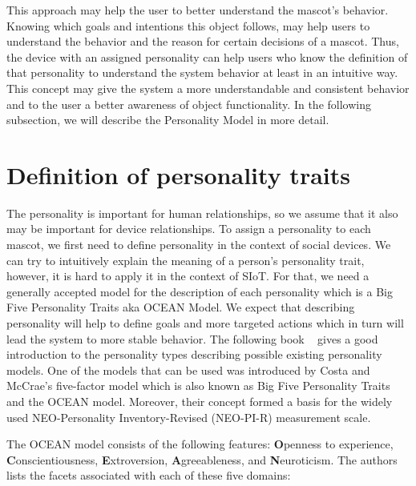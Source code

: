 This approach may help the user to better understand the mascot's behavior.
Knowing which goals and intentions this object follows, may help users to understand the
behavior and the reason for certain decisions of a mascot.
Thus, the device with an assigned personality can help users who know the definition
of that personality to understand the system behavior at least in an intuitive way.
This concept may give the system a more understandable and consistent behavior
and to the user a better awareness of object functionality.
In the following subsection, we will describe the Personality Model in more detail.

\section{Definition of personality traits}
\label{sec:Definition of Personality Traits}

The personality is important for human relationships, so we assume that it also may be important for device relationships.
To assign a personality to each mascot, we first need to define personality in the context of social devices.
We can try to intuitively explain the meaning of a person’s personality trait,
however, it is hard to apply it in the context of SIoT\@.
For that, we need a generally accepted model for the description of each personality which is a
Big Five Personality Traits aka OCEAN Model\@.
We expect that describing personality will help to define goals and
more targeted actions which in turn will lead the system to more stable behavior.
The following book ~\cite{matthews2003personality} gives a good introduction to the
personality types describing possible existing personality models.
One of the models that can be used was introduced by Costa and McCrae’s five-factor
model which is also known as Big Five Personality Traits and the OCEAN model.
Moreover, their concept formed a basis for the widely used NEO-Personality
Inventory-Revised (NEO-PI-R) measurement scale.

The OCEAN model consists of the following features: \textbf{O}penness to experience,
\textbf{C}onscientiousness, \textbf{E}xtroversion, \textbf{A}greeableness, and \textbf{N}euroticism.
The authors lists the facets associated with each of these five domains:

